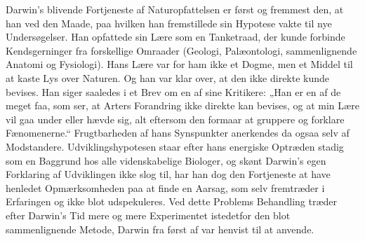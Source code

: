 \documentclass[12pt,a4paper,openany]{book}
\newcommand{\opage}[1]{\marginnote{\footnotesize\textit{[#1]}}}
\begin{document}
Darwin’s blivende Fortjeneste af Naturopfattelsen er først og fremmest
den, at han ved den Maade, paa hvilken han fremstillede sin
Hypotese vakte til nye Undersøgelser. Han opfattede sin Lære som
en Tanketraad, der kunde forbinde Kendsgerninger fra forskellige
Omraader (Geologi, Palæontologi, sammenlignende Anatomi og
Fysiologi). Hans Lære var for ham ikke et Dogme, men et Middel til
at kaste Lys over Naturen. Og han var klar over, at den ikke direkte
kunde bevises. Han siger saaledes i et Brev om en af sine Kritikere:
„Han er en af de meget faa, som ser, at Arters Forandring ikke direkte
kan bevises, og at min Lære vil gaa under eller hævde sig, alt
\opage{40}eftersom den formaar at gruppere og forklare Fænomenerne.“ Frugtbarheden
af hans Synspunkter anerkendes da ogsaa selv af Modstandere. Udviklingshypotesen staar efter hans energiske Optræden
stadig som en Baggrund hos alle videnskabelige Biologer, og skønt
Darwin’s egen Forklaring af Udviklingen ikke slog til, har han dog
den Fortjeneste at have henledet Opmærksomheden paa at finde en
Aarsag, som selv fremtræder i Erfaringen og ikke blot udspekuleres.
Ved dette Problems Behandling træder efter Darwin’s Tid mere og
mere Experimentet istedetfor den blot sammenlignende Metode, Darwin
fra først af var henvist til at anvende.
\end{document}
